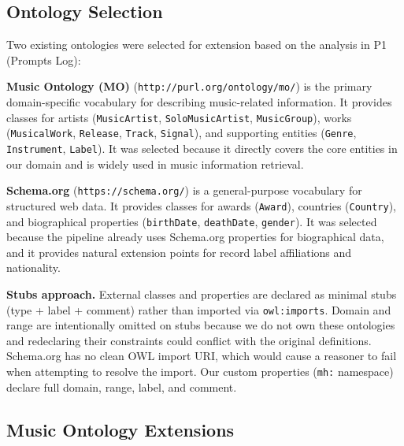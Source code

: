 \subsection{Ontology Selection}

Two existing ontologies were selected for extension based on the analysis in P1 (Prompts Log):

\textbf{Music Ontology (MO)} (\texttt{http://purl.org/ontology/mo/}) is the primary domain-specific vocabulary for describing music-related information. It provides classes for artists (\texttt{MusicArtist}, \texttt{SoloMusicArtist}, \texttt{MusicGroup}), works (\texttt{MusicalWork}, \texttt{Release}, \texttt{Track}, \texttt{Signal}), and supporting entities (\texttt{Genre}, \texttt{Instrument}, \texttt{Label}). It was selected because it directly covers the core entities in our domain and is widely used in music information retrieval.

\textbf{Schema.org} (\texttt{https://schema.org/}) is a general-purpose vocabulary for structured web data. It provides classes for awards (\texttt{Award}), countries (\texttt{Country}), and biographical properties (\texttt{birthDate}, \texttt{deathDate}, \texttt{gender}). It was selected because the pipeline already uses Schema.org properties for biographical data, and it provides natural extension points for record label affiliations and nationality.

\textbf{Stubs approach.} External classes and properties are declared as minimal stubs (type + label + comment) rather than imported via \texttt{owl:imports}. Domain and range are intentionally omitted on stubs because we do not own these ontologies and redeclaring their constraints could conflict with the original definitions. Schema.org has no clean OWL import URI, which would cause a reasoner to fail when attempting to resolve the import. Our custom properties (\texttt{mh:} namespace) declare full domain, range, label, and comment.

\subsection{Music Ontology Extensions}

